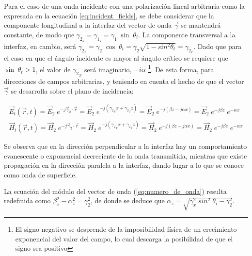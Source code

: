 Para el caso de una onda incidente con una polarización lineal arbitraria como la expresada en la ecuación \ref{eq:incident_fields}, se debe considerar que la componente longitudinal a la interfaz del vector de onda $\vec{\gamma}$ se mantendrá constante, de modo que $\gamma_{2_z} = \gamma_{1_z} = \gamma_1 \; \sin \; \theta_i$. La componente transversal a la interfaz, en cambio, será $\gamma_{2_x} = \gamma_2\; \cos \; \theta_t = \gamma_2 \sqrt{1-sin^2\theta_t} = \gamma_{2_x}$. Dado que para el caso en que el ángulo incidente es mayor al ángulo crítico se requiere que $\sin\;\theta_t > 1$, el valor de ${\gamma_2}_x$ será imaginario, $-i\alpha$ \footnote{El signo negativo se desprende de la imposibilidad física de un crecimiento exponencial del valor del campo, lo cual descarga la posibilidad de que el signo sea positivo}. De esta forma, para direcciones de campos arbitrarias, y teniendo en cuenta el hecho de que el vector $\vec{\gamma}$ se desarrolla sobre el plano de incidencia:

\begin{subequations}
	\begin{align}
		\vec{E}_t (\vec{r},t) = \vec{E}_2 \; e^{-j \vec{\gamma}_2 \cdot \vec{r}} = \vec{E}_2 \; e^{-j({\gamma_2}_x x + {\gamma_2}_z z)} = \vec{E}_2 \; e^{-j(\beta z - j\alpha x)} = \vec{E}_2 \; e^{-j\beta z} \; e^{- \alpha x}\\
		\vec{H}_t (\vec{r},t) = \vec{H}_2 \; e^{-j \vec{\gamma}_2 \cdot \vec{r}} = \vec{H}_2 \; e^{-j({\gamma_2}_x x + {\gamma_2}_z z)} = \vec{H}_2 \; e^{-j(\beta z - j\alpha x)} = \vec{H}_2 \; e^{-j\beta z} \; e^{- \alpha x}
	\end{align}
\end{subequations}

Se observa que en la dirección perpendicular a la interfaz hay un comportamiento evanescente o exponencial decreciente de la onda transmitida, mientras que existe propagación en la dirección paralela a la interfaz, dando lugar a lo que se conoce como onda de superficie.

La ecuación del módulo del vector de onda (\ref{eq:numero_de_onda}) resulta redefinida como $\beta_x^2 - \alpha_z^2 = \gamma_2^2$, de donde se deduce que $\alpha_z = \sqrt{\gamma_x^2\;sin^2\;\theta_i - \gamma_2^2}$.